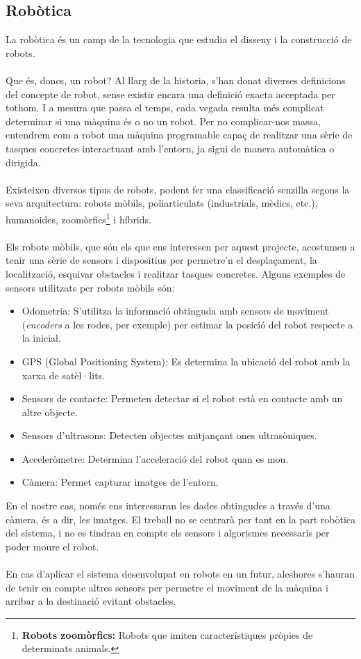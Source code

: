 	\subsection{Robòtica}
		La robòtica és un camp de la tecnologia que estudia el disseny i la construcció de robots.\\\\
		Que és, doncs, un robot? Al llarg de la historia, s'han donat diverses definicions del concepte de robot, sense existir encara una definició exacta acceptada per tothom. I a mesura que passa el temps,
		cada vegada resulta més complicat determinar si una màquina és o no un robot. Per no complicar-nos massa, entendrem com a robot una màquina programable capaç de realitzar una sèrie de
		tasques concretes interactuant amb l'entorn, ja sigui de manera automàtica o dirigida.\\\\
		Existeixen diversos tipus de robots, podent fer una classificació senzilla segons la seva arquitectura: robots mòbils, poliarticulats (industrials, mèdics, etc.), humanoides, 
		zoomòrfics\footnote{\textbf{Robots zoomòrfics:} Robots que imiten característiques pròpies de determinats animals.} i híbrids.\\\\
		Els robots mòbils, que són els que ens interessen per aquest projecte, acostumen a tenir una sèrie de sensors i dispositius per permetre'n el desplaçament, la localització, esquivar obstacles i
		realitzar tasques concretes. Alguns exemples de sensors utilitzats per robots mòbils són:\\
		\begin{itemize}
			\item Odometria: S'utilitza la informació obtinguda amb sensors de moviment (\textit{encoders} a les rodes, per exemple) per estimar la posició del robot respecte a la inicial.
			\item GPS (Global Positioning System): Es determina la ubicació del robot amb la xarxa de satèl·lits.
			\item Sensors de contacte: Permeten detectar si el robot està en contacte amb un altre objecte.
			\item Sensors d'ultrasons: Detecten objectes mitjançant ones ultrasòniques.
			\item Acceleròmetre: Determina l'acceleració del robot quan es mou. 
			\item Càmera: Permet capturar imatges de l'entorn.\\
		\end{itemize}
		En el nostre cas, només ens interessaran les dades obtingudes a través d'una càmera, és a dir, les imatges. El treball no se centrarà per tant en la part robòtica del sistema, i no es tindran en compte
		els sensors i algorismes necessaris per poder moure el robot.\\\\
		En cas d'aplicar el sistema desenvolupat en robots en un futur, aleshores s'hauran de tenir en compte altres sensors per permetre el moviment
		de la màquina i arribar a la destinació evitant obstacles.
